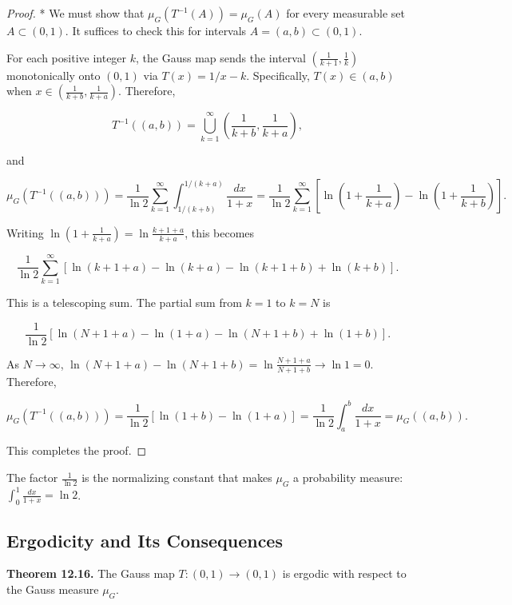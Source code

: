 \begin{proof}
* We must show that $\mu_G(T^{-1}(A)) = \mu_G(A)$ for every measurable set $A \subset (0, 1)$. It suffices to check this for intervals $A = (a, b) \subset (0, 1)$.

For each positive integer $k$, the Gauss map sends the interval $\left(\frac{1}{k+1}, \frac{1}{k}\right)$ monotonically onto $(0, 1)$ via $T(x) = 1/x - k$. Specifically, $T(x) \in (a, b)$ when $x \in \left(\frac{1}{k+b}, \frac{1}{k+a}\right)$. Therefore,

\[
T^{-1}((a, b)) = \bigcup_{k=1}^{\infty} \left(\frac{1}{k+b}, \frac{1}{k+a}\right),
\]

and

\[
\mu_G(T^{-1}((a, b))) = \frac{1}{\ln 2} \sum_{k=1}^{\infty} \int_{1/(k+b)}^{1/(k+a)} \frac{dx}{1+x} = \frac{1}{\ln 2} \sum_{k=1}^{\infty} \left[\ln\left(1 + \frac{1}{k+a}\right) - \ln\left(1 + \frac{1}{k+b}\right)\right].
\]

Writing $\ln(1 + \frac{1}{k+a}) = \ln\frac{k+1+a}{k+a}$, this becomes

\[
\frac{1}{\ln 2}\sum_{k=1}^{\infty}\left[\ln(k+1+a) - \ln(k+a) - \ln(k+1+b) + \ln(k+b)\right].
\]

This is a telescoping sum. The partial sum from $k = 1$ to $k = N$ is

\[
\frac{1}{\ln 2}\left[\ln(N+1+a) - \ln(1+a) - \ln(N+1+b) + \ln(1+b)\right].
\]

As $N \to \infty$, $\ln(N+1+a) - \ln(N+1+b) = \ln\frac{N+1+a}{N+1+b} \to \ln 1 = 0$. Therefore,

\[
\mu_G(T^{-1}((a, b))) = \frac{1}{\ln 2}\left[\ln(1+b) - \ln(1+a)\right] = \frac{1}{\ln 2}\int_a^b \frac{dx}{1+x} = \mu_G((a, b)).
\]

This completes the proof.
\end{proof}


\begin{remark}
The factor $\frac{1}{\ln 2}$ is the normalizing constant that makes $\mu_G$ a probability measure: $\int_0^1 \frac{dx}{1+x} = \ln 2$.
\end{remark}


\subsection{Ergodicity and Its Consequences}\label{sec:12.5.3}

\textbf{Theorem 12.16.} The Gauss map $T: (0,1) \to (0,1)$ is ergodic with respect to the Gauss measure $\mu_G$.

